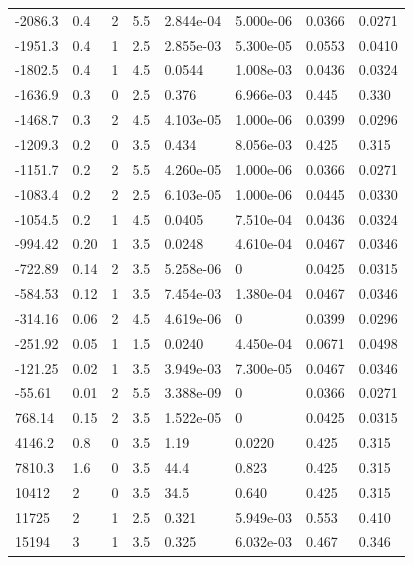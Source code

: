 \documentclass[preview]{standalone}
\begin{document}
{{\begin{tabular}{L{1.2cm}C{1.2cm} C{0.3cm}C{0.5cm} C{1.4cm}C{1.4cm} C{1.4cm}C{1.4cm}}
  -2086.3  &   0.4  & 2     & 5.5 &  2.844e-04  & 5.000e-06  & 0.0366 &  0.0271   \\ 
  -1951.3  &   0.4  & 1     & 2.5 &  2.855e-03  & 5.300e-05  & 0.0553 &  0.0410   \\ 
  -1802.5  &   0.4  & 1     & 4.5 &  0.0544  & 1.008e-03  & 0.0436 &  0.0324   \\ 
  -1636.9  &   0.3  & 0     & 2.5 &  0.376  & 6.966e-03  & 0.445 &  0.330   \\ 
  -1468.7  &   0.3  & 2     & 4.5 &  4.103e-05  & 1.000e-06  & 0.0399 &  0.0296   \\ 
  -1209.3  &   0.2  & 0     & 3.5 &  0.434  & 8.056e-03  & 0.425 &  0.315   \\ 
  -1151.7  &   0.2  & 2     & 5.5 &  4.260e-05  & 1.000e-06  & 0.0366 &  0.0271   \\ 
  -1083.4  &   0.2  & 2     & 2.5 &  6.103e-05  & 1.000e-06  & 0.0445 &  0.0330   \\ 
  -1054.5  &   0.2  & 1     & 4.5 &  0.0405  & 7.510e-04  & 0.0436 &  0.0324   \\ 
  -994.42  &  0.20  & 1     & 3.5 &  0.0248  & 4.610e-04  & 0.0467 &  0.0346   \\ 
  -722.89  &  0.14  & 2     & 3.5 &  5.258e-06  & 0  & 0.0425 &  0.0315   \\ 
  -584.53  &  0.12  & 1     & 3.5 &  7.454e-03  & 1.380e-04  & 0.0467 &  0.0346   \\ 
  -314.16  &  0.06  & 2     & 4.5 &  4.619e-06  & 0  & 0.0399 &  0.0296   \\ 
  -251.92  &  0.05  & 1     & 1.5 &  0.0240  & 4.450e-04  & 0.0671 &  0.0498   \\ 
  -121.25  &  0.02  & 1     & 3.5 &  3.949e-03  & 7.300e-05  & 0.0467 &  0.0346   \\ 
  -55.61  &  0.01  & 2     & 5.5 &  3.388e-09  & 0  & 0.0366 &  0.0271   \\ 
  768.14  &  0.15  & 2     & 3.5 &  1.522e-05  & 0  & 0.0425 &  0.0315   \\ 
  4146.2  &   0.8  & 0     & 3.5 &  1.19  & 0.0220  & 0.425 &  0.315   \\ 
  7810.3  &   1.6  & 0     & 3.5 &  44.4  & 0.823  & 0.425 &  0.315   \\ 
  10412  &     2  & 0     & 3.5 &  34.5  & 0.640  & 0.425 &  0.315   \\ 
  11725  &     2  & 1     & 2.5 &  0.321  & 5.949e-03  & 0.553 &  0.410   \\ 
  15194  &     3  & 1     & 3.5 &  0.325  & 6.032e-03  & 0.467 &  0.346   \\ 

\end{tabular}}}
\end{document}
